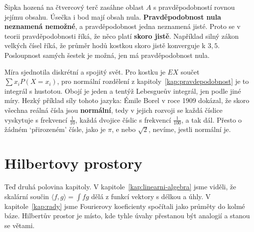 \begin{center}
\end{center}

Šipka hozená na čtvercový terč zasáhne oblast $A$ s pravděpodobností rovnou jejímu obsahu. Úsečka i bod mají obsah nula. \textbf{Pravděpodobnost nula neznamená nemožné}, a pravděpodobnost jedna neznamená jisté. Proto se v teorii pravděpodobnosti říká, že něco platí \textbf{skoro jistě}. Například silný zákon velkých čísel říká, že průměr hodů kostkou skoro jistě konverguje k $3{,}5$. Posloupnost samých šestek je možná, jen má pravděpodobnost nula.

Míra sjednotila diskrétní a spojitý svět. Pro kostku je $E X$ součet $\sum x_iP(X = x_i)$, pro normální rozdělení z kapitoly~\ref{kap:pravdepodobnost} je to integrál s hustotou. Obojí je jeden a tentýž Lebesgueův integrál, jen podle jiné míry. Hezký příklad síly tohoto jazyka: Émile Borel v roce 1909 dokázal, že skoro všechna reálná čísla jsou \textbf{normální}, tedy v jejich rozvoji se každá číslice vyskytuje s frekvencí $\frac{1}{10}$, každá dvojice číslic s frekvencí $\frac{1}{100}$, a tak dál. Přesto o žádném `přirozeném' čísle, jako je $\pi$, $\mathrm{e}$ nebo $\sqrt{2}$, nevíme, jestli normální je.

\section{Hilbertovy prostory}

Teď druhá polovina kapitoly. V kapitole~\ref{kap:linearni-algebra} jsme viděli, že skalární součin $\langle f, g\rangle = \int f g$ dělá z funkcí vektory s délkou a úhly. V kapitole~\ref{kap:rady} jsme Fourierovy koeficienty spočítali jako průměty do kolmé báze. Hilbertův prostor je místo, kde tyhle úvahy přestanou být analogií a stanou se větami.

